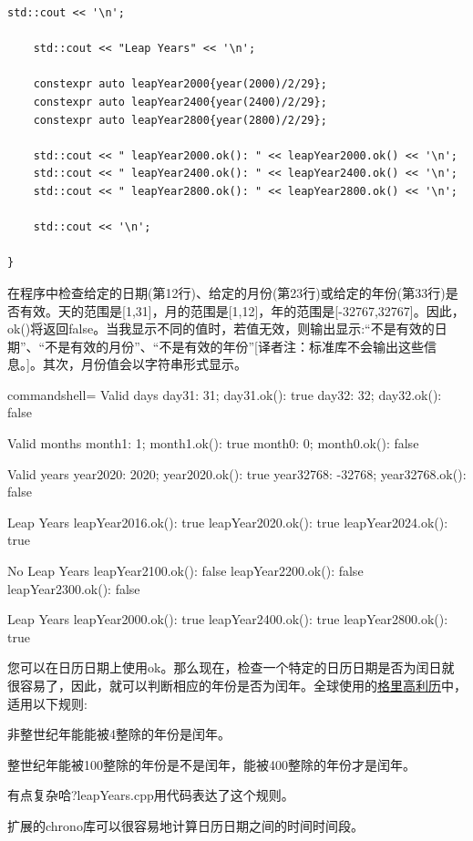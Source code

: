 \begin{lstlisting}[style=styleCXX]
	std::cout << '\n';
	
	std::cout << "Leap Years" << '\n';
	
	constexpr auto leapYear2000{year(2000)/2/29};
	constexpr auto leapYear2400{year(2400)/2/29};
	constexpr auto leapYear2800{year(2800)/2/29};
	
	std::cout << " leapYear2000.ok(): " << leapYear2000.ok() << '\n';
	std::cout << " leapYear2400.ok(): " << leapYear2400.ok() << '\n';
	std::cout << " leapYear2800.ok(): " << leapYear2800.ok() << '\n';
	
	std::cout << '\n';
	
}
\end{lstlisting}

在程序中检查给定的日期(第12行)、给定的月份(第23行)或给定的年份(第33行)是否有效。天的范围是[1,31]，月的范围是[1,12]，年的范围是[-32767,32767]。因此，ok()将返回false。当我显示不同的值时，若值无效，则输出显示:“不是有效的日期”、“不是有效的月份”、“不是有效的年份”[译者注：标准库不会输出这些信息。]。其次，月份值会以字符串形式显示。

\begin{tcblisting}{commandshell={}}
Valid days
  day31: 31; day31.ok(): true
  day32: 32; day32.ok(): false

Valid months
  month1: 1; month1.ok(): true
  month0: 0; month0.ok(): false

Valid years
  year2020: 2020; year2020.ok(): true
  year32768: -32768; year32768.ok(): false

Leap Years
  leapYear2016.ok(): true
  leapYear2020.ok(): true
  leapYear2024.ok(): true

No Leap Years
  leapYear2100.ok(): false
  leapYear2200.ok(): false
  leapYear2300.ok(): false

Leap Years
  leapYear2000.ok(): true
  leapYear2400.ok(): true
  leapYear2800.ok(): true
\end{tcblisting}

您可以在日历日期上使用ok。那么现在，检查一个特定的日历日期是否为闰日就很容易了，因此，就可以判断相应的年份是否为闰年。全球使用的\href{https://en.wikipedia.org/wiki/Gregorian_calendar}{格里高利历}中，适用以下规则:

非整世纪年能能被4整除的年份是闰年。
 
整世纪年能被100整除的年份是不是闰年，能被400整除的年份才是闰年。

有点复杂哈?leapYears.cpp用代码表达了这个规则。

扩展的chrono库可以很容易地计算日历日期之间的时间时间段。

